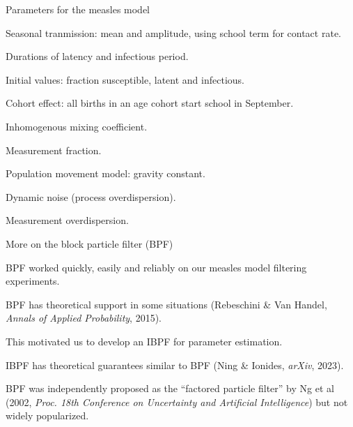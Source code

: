 \documentclass{beamer}
\begin{document}
\begin{frame}{Parameters for the measles model}
  \bi
\item Seasonal tranmission: mean and amplitude, using school term for contact rate.
  \item Durations of latency and infectious period.
\item Initial values: fraction susceptible, latent and infectious.
\item Cohort effect: all births in an age cohort start school in September.
\item Inhomogenous mixing coefficient.
\item Measurement fraction.
\item Population movement model: gravity constant.
\item Dynamic noise (process overdispersion).
\item Measurement overdispersion.

\ei

  \end{frame}

\begin{frame}{More on the block particle filter (BPF)}

\bi
\item BPF worked quickly, easily and reliably on our measles model filtering experiments.

        \vspace{2mm}


\item BPF has theoretical support in some situations (Rebeschini \& Van Handel, {\it Annals of Applied Probability}, 2015).

        \vspace{2mm}

      \item This motivated us to develop an IBPF for parameter estimation.
        
        \vspace{2mm}

      \item IBPF has theoretical guarantees similar to BPF (Ning \& Ionides, {\it arXiv}, 2023).
        
        \vspace{2mm}

        
\item BPF was independently proposed as the ``factored particle filter'' by Ng et al (2002, {\it Proc. 18th Conference on Uncertainty and Artificial Intelligence}) but not widely popularized.

\ei

\end{frame}
\end{document}
